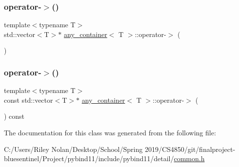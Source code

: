 \mbox{\label{classany__container_a47c855832d83d1ccb543ff206b59f327}} 
\subsubsection{\texorpdfstring{operator-\/$>$()}{operator->()}\hspace{0.1cm}{\footnotesize\ttfamily [1/2]}}
{\footnotesize\ttfamily template$<$typename T$>$ \\
std\+::vector$<$T$>$$\ast$ \mbox{\hyperlink{classany__container}{any\+\_\+container}}$<$ T $>$\+::operator-\/$>$ (\begin{DoxyParamCaption}{ }\end{DoxyParamCaption})\hspace{0.3cm}{\ttfamily [inline]}}

\mbox{\label{classany__container_ac8c067f37efdffba9d64bf34823c4ad6}} 
\subsubsection{\texorpdfstring{operator-\/$>$()}{operator->()}\hspace{0.1cm}{\footnotesize\ttfamily [2/2]}}
{\footnotesize\ttfamily template$<$typename T$>$ \\
const std\+::vector$<$T$>$$\ast$ \mbox{\hyperlink{classany__container}{any\+\_\+container}}$<$ T $>$\+::operator-\/$>$ (\begin{DoxyParamCaption}{ }\end{DoxyParamCaption}) const\hspace{0.3cm}{\ttfamily [inline]}}



The documentation for this class was generated from the following file\+:\begin{DoxyCompactItemize}
\item 
C\+:/\+Users/\+Riley Nolan/\+Desktop/\+School/\+Spring 2019/\+C\+S4850/git/finalproject-\/bluesentinel/\+Project/pybind11/include/pybind11/detail/\mbox{\hyperlink{detail_2common_8h}{common.\+h}}\end{DoxyCompactItemize}
